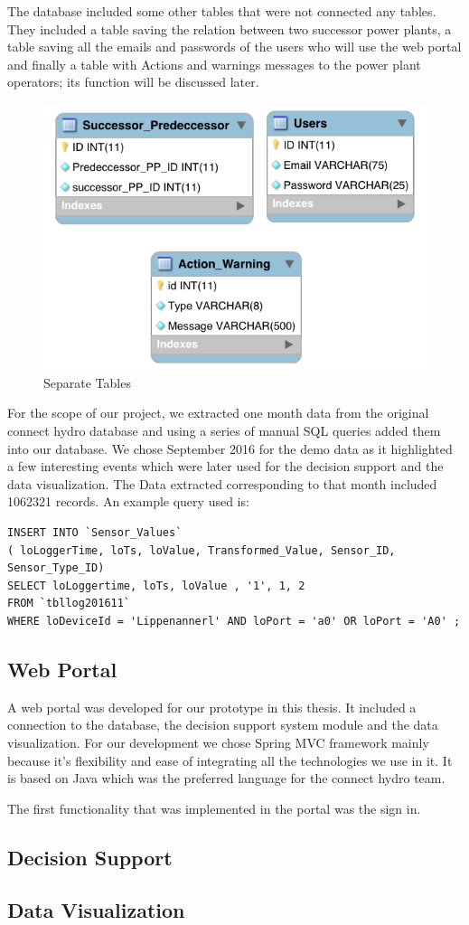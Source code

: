 The database included some other tables that were not connected any tables. They included a table saving the relation between two successor power plants, a table saving all the emails and passwords of the users who will use the web portal and finally a table with Actions and warnings messages to the power plant operators; its function will be discussed later.
\begin{figure}[H]
\centering
\includegraphics[scale=0.5]{Images/Othertables.png}
\caption[Separate Tables]{Separate Tables}
\end{figure}
For the scope of our project, we extracted one month data from the original connect hydro database and using a series of manual SQL queries added them into our database. We chose September 2016 for the demo data as it highlighted a few interesting events which were later used for the decision support and the data visualization. The Data extracted corresponding to that month included 1062321 records. An example query used is:\\
\begin{center}
\begin{verbatim}
INSERT INTO `Sensor_Values` 
( loLoggerTime, loTs, loValue, Transformed_Value, Sensor_ID, Sensor_Type_ID) 
SELECT loLoggertime, loTs, loValue , '1', 1, 2 
FROM `tbllog201611` 
WHERE loDeviceId = 'Lippenannerl' AND loPort = 'a0' OR loPort = 'A0' ;
\end{verbatim}
\end{center}
\subsection{Web Portal}
A web portal was developed for our prototype in this thesis. It included a connection to the database, the decision support system module and the data visualization. For our development we chose Spring MVC framework mainly because it's flexibility and ease of integrating all the technologies we use in it. It is based on Java which was the preferred language for the connect hydro team.

The first functionality that was implemented in the portal was the sign in. 
\subsection{Decision Support}
\label{subsec:DecisionSuport}
\subsection{Data Visualization}
\label{subsec:DataVisualization}